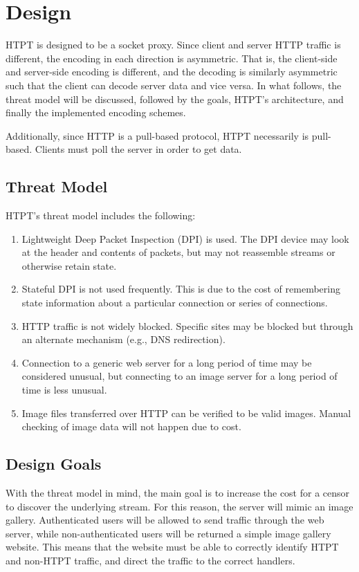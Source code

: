 \section{Design}
HTPT is designed to be a socket proxy. Since client and server HTTP traffic is different, the encoding in each direction is asymmetric. That is, the client-side and server-side encoding is different, and the decoding is similarly asymmetric such that the client can decode server data and vice versa. In what follows, the threat model will be discussed, followed by the goals, HTPT's architecture, and finally the implemented encoding schemes.

Additionally, since HTTP is a pull-based protocol, HTPT necessarily is pull-based. Clients must poll the server in order to get data.

\subsection{Threat Model}
HTPT's threat model includes the following:
\begin{enumerate}
  \item Lightweight Deep Packet Inspection (DPI) is used. The DPI device may look at the header and contents of packets, but may not reassemble streams or otherwise retain state.
  \item Stateful DPI is not used frequently. This is due to the cost of remembering state information about a particular connection or series of connections.
  \item HTTP traffic is not widely blocked. Specific sites may be blocked but through an alternate mechanism (e.g., DNS redirection).
  \item Connection to a generic web server for a long period of time may be considered unusual, but connecting to an image server for a long period of time is less unusual.
  \item Image files transferred over HTTP can be verified to be valid images. Manual checking of image data will not happen due to cost.
\end{enumerate}

\subsection{Design Goals}
With the threat model in mind, the main goal is to increase the cost for a censor to discover the underlying stream. For this reason, the server will mimic an image gallery. Authenticated users will be allowed to send traffic through the web server, while non-authenticated users will be returned a simple image gallery website. This means that the website must be able to correctly identify HTPT and non-HTPT traffic, and direct the traffic to the correct handlers. 

